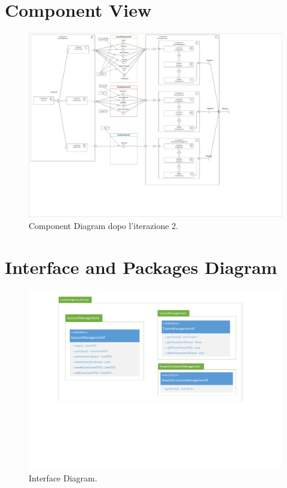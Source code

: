 \section{Component View}

\begin{figure}[h!]
	\centering
	\includegraphics[width=1\linewidth]{./Iterazione 2/OtherFiles/UML - Component View}
	\caption{Component Diagram dopo l'iterazione 2.}
	\label{fig:ComponentDiagram_iterazione2}
\end{figure}

\clearpage

\section{Interface and Packages Diagram}

\begin{figure}[h]
	\centering
	\includegraphics[width=1\linewidth]{./Iterazione 2/OtherFiles/UML - Interface Diagram}
	\caption{Interface Diagram.}
	\label{fig:InterfaceDiagram_iterazione2}
\end{figure}
